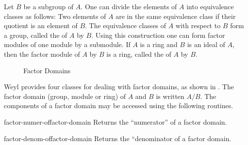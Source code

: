 Let $B$ be a subgroup of $A$.  One can divide the elements of $A$ into
equivalence classes as follows:  Two elements of $A$ are in the same
equivalence class if their quotient is an element of $B$.  The
equivalence classes of $A$ with respect to $B$ form a group, called
the  of $A$ by $B$.  Using this construction one
can form factor modules of one module by a submodule.  If $A$ is a
ring and $B$ is an ideal of $A$, then the factor module of $A$ by $B$
is a ring, called the  of $A$ by $B$.

\begin{figure}
\begin{center}
\end{center}
\caption{Factor Domains\label{FactorDomains:Fig}}
\end{figure}

Weyl provides four classes for dealing with factor domains, as shown
in .  The factor domain (group, module or
ring) of $A$ and $B$ is written $A/B$.  The components of a factor
domain may be accessed using the following routines.

\begin{functiondef}{factor-numer-of}{factor-domain}
Returns the ``numerator'' of a factor domain.
\end{functiondef}

\begin{functiondef}{factor-denom-of}{factor-domain}
Returns the ``denominator of a factor domain.
\end{functiondef}
